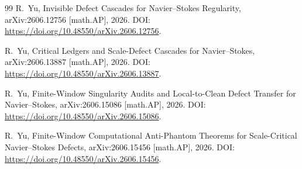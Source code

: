 \documentclass[11pt]{article}
\numberwithin{equation}{section}
\theoremstyle{definition}
\theoremstyle{remark}
\begin{document}
\begin{thebibliography}{99}
R.~Yu,
\newblock Invisible Defect Cascades for Navier--Stokes Regularity,
\newblock arXiv:2606.12756 [math.AP], 2026.
\newblock DOI: \url{https://doi.org/10.48550/arXiv.2606.12756}.

R.~Yu,
\newblock Critical Ledgers and Scale-Defect Cascades for Navier--Stokes,
\newblock arXiv:2606.13887 [math.AP], 2026.
\newblock DOI: \url{https://doi.org/10.48550/arXiv.2606.13887}.

R.~Yu,
\newblock Finite-Window Singularity Audits and Local-to-Clean Defect Transfer for Navier--Stokes,
\newblock arXiv:2606.15086 [math.AP], 2026.
\newblock DOI: \url{https://doi.org/10.48550/arXiv.2606.15086}.

R.~Yu,
\newblock Finite-Window Computational Anti-Phantom Theorems for Scale-Critical Navier--Stokes Defects,
\newblock arXiv:2606.15456 [math.AP], 2026.
\newblock DOI: \url{https://doi.org/10.48550/arXiv.2606.15456}.

\end{thebibliography}
\end{document}
